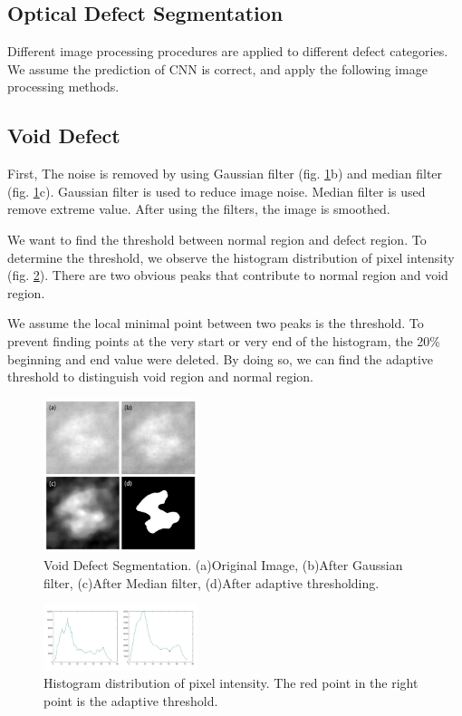 \documentclass[conference]{IEEEtran}
\begin{document}
\begin{CJK}{UTF8}{bsmi}
\section{Optical Defect Segmentation}

Different image processing procedures are applied to different defect categories. We assume the prediction of CNN is correct, and apply the following image processing methods.

\subsection{Void Defect}
First, The noise is removed by using Gaussian filter (fig. \ref{fig:Void}b) and median filter (fig. \ref{fig:Void}c). Gaussian filter is used to reduce image noise. Median filter is used remove extreme value. After using the filters, the image is smoothed.

We want to find the threshold between normal region and defect region. To determine the threshold, we observe the histogram distribution of pixel intensity (fig. \ref{fig:Histogram}). There are two obvious peaks that contribute to normal region and void region.

We assume the local minimal point between two peaks is the threshold. To prevent finding points at the very start or very end of the histogram, the 20\% beginning and end value were deleted. By doing so, we can find the adaptive threshold to distinguish void region and normal region.

\begin{figure}[!htbp]
\centerline{\includegraphics[width=0.4\textwidth]{../figures/Void.png}}
\caption{Void Defect Segmentation. (a)Original Image, (b)After Gaussian filter, (c)After Median filter, (d)After adaptive thresholding.}
\label{fig:Void}
\end{figure}

\begin{figure}[!htbp]
\centerline{\includegraphics[width=0.4\textwidth]{../figures/histogram.png}}
\caption{Histogram distribution of pixel intensity. The red point in the right point is the adaptive threshold.}
\label{fig:Histogram}
\end{figure}


\end{CJK}
\end{document}
